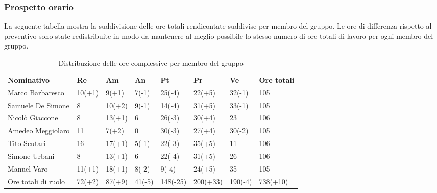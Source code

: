 \subsubsection{Prospetto orario}
La seguente tabella mostra la suddivisione delle ore totali rendicontate suddivise per membro del gruppo. Le ore di differenza rispetto al preventivo sono state redistribuite in modo da mantenere al meglio possibile lo stesso numero di ore totali di lavoro per ogni membro del gruppo.
\begin{center}
    \begin{table}[ht!]
        \centering
        \caption{Distribuzione delle ore complessive per membro del gruppo}
        \vspace{5px}
        \renewcommand{\arraystretch}{1.8}
        \begin{tabular}{p{100px} p{30px} p{30px} p{35px} p{40px} p{40px} p{35px} p{50px} }
            \rowcolor{logo!70} \textbf{Nominativo} & \textbf{Re} & \textbf{Am} & \textbf{An} & \textbf{Pt} & \textbf{Pr} & \textbf{Ve} & \textbf{Ore totali} \\
            Marco Barbaresco                       & 10(+1)      & 9(+1)       & 7(-1)       & 25(-4)      & 22(+5)      & 32(-1)      & 105                 \\
            Samuele De Simone                      & 8           & 10(+2)      & 9(-1)       & 14(-4)      & 31(+5)      & 33(-1)      & 105                 \\
            Nicolò Giaccone                        & 8           & 13(+1)      & 6           & 26(-3)      & 30(+4)      & 23          & 106                 \\
            Amedeo Meggiolaro                      & 11          & 7(+2)       & 0           & 30(-3)      & 27(+4)      & 30(-2)      & 105                 \\
            Tito Scutari                           & 16          & 17(+1)      & 5(-1)       & 22(-3)      & 35(+5)      & 11          & 106                 \\
            Simone Urbani                          & 8           & 13(+1)      & 6           & 22(-4)      & 31(+5)      & 26          & 106                 \\
            Manuel Varo                            & 11(+1)      & 18(+1)      & 8(-2)       & 9(-4)       & 24(+5)      & 35          & 105                 \\
            Ore totali di ruolo                    & 72(+2)      & 87(+9)      & 41(-5)      & 148(-25)    & 200(+33)    & 190(-4)     & 738(+10)            \\
        \end{tabular}
    \end{table}
\end{center}

